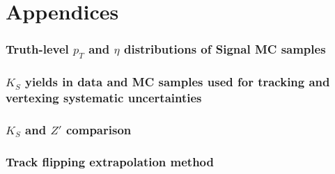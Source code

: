 \documentclass[NOTE, english, texlive=2017]{\ATLASLATEXPATH atlasdoc}
\begin{document}
\part*{Appendices}

\appendix
\section{Truth-level $p_{T}$ and $\eta$ distributions of Signal MC samples}
\label{app:signal_truth}


\newpage

\section{$K_{S}$ yields in data and MC samples used for tracking and vertexing systematic uncertainties}
\label{app:syst_Ks_fit}


\newpage

\section{$K_{S}$ and $Z'$ comparison}
\label{app:syst_Ks_Zp}


\newpage

\section{Track flipping extrapolation method}
\label{app:TF_extrapolation}









\end{document}
